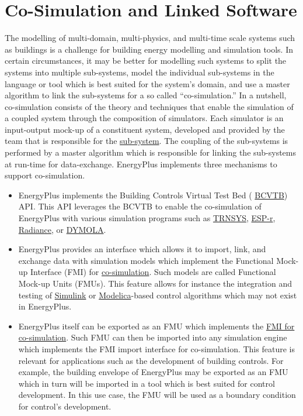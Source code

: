 \section{Co-Simulation and Linked Software}

The modelling of multi-domain, multi-physics, and multi-time scale
systems such as buildings is a challenge for building energy modelling
and simulation tools. In certain circumstances, it may be better for
modelling such systems to split the systems into multiple sub-systems,
model the individual sub-systems in the language or tool which is
best suited for the system\textquoteright s domain, and use a master
algorithm to link the sub-systems for a so called \textquotedblleft co-simulation.\textquotedblright{}
In a nutshell, co-simulation consists of the theory and techniques
that enable the simulation of a coupled system through the composition
of simulators. Each simulator is an input-output mock-up of a constituent
system, developed and provided by the team that is responsible for
the \href{https://arxiv.org/abs/1702.00686}{sub-system}. The coupling
of the sub-systems is performed by a master algorithm which is responsible
for linking the sub-systems at run-time for data-exchange. EnergyPlus
implements three mechanisms to support co-simulation.
\begin{itemize}
\item EnergyPlus implements the Building Controls Virtual Test Bed ( \href{https://www.tandfonline.com/doi/abs/10.1080/19401493.2010.518631}{BCVTB}) API.
This API leverages the BCVTB to enable the co-simulation of EnergyPlus with various simulation programs such as \href{http://www.trnsys.com/}{TRNSYS},
\href{http://www.esru.strath.ac.uk/Programs/ESP-r.htm}{ESP-r}, \href{http://radsite.lbl.gov/radiance/HOME.html}{Radiance}, or
\href{https://www.3ds.com/products-services/catia/products/dymola/}{DYMOLA}.
\item EnergyPlus provides an interface which allows it to import, link,
and exchange data with simulation models which implement the Functional
Mock-up Interface (FMI) for \href{https://www.tandfonline.com/doi/abs/10.1080/19401493.2013.808265}{co-simulation}.
Such models are called Functional Mock-up Units (FMUs). This feature
allows for instance the integration and testing of \href{https://www.mathworks.com/}{Simulink}
or \href{https://www.modelica.org/}{Modelica}-based control algorithms
which may not exist in EnergyPlus.
\item EnergyPlus itself can be exported as an FMU which implements the \href{https://simulationresearch.lbl.gov/wetter/download/2014_NouiduiWetter.pdf}{FMI for co-simulation}.
Such FMU can then be imported into any simulation engine which implements
the FMI import interface for co-simulation. This feature is relevant
for applications such as the development of building controls. For
example, the building envelope of EnergyPlus may be exported as an
FMU which in turn will be imported in a tool which is best suited
for control development. In this use case, the FMU will be used as
a boundary condition for control's development.
\end{itemize}

